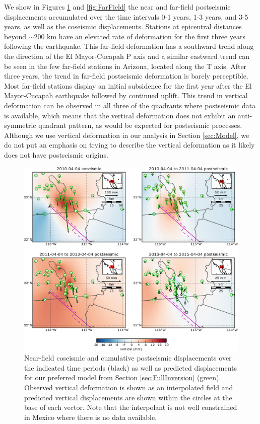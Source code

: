 \documentclass[draft,linenumbers]{AGUJournal}
\begin{document}
We show in Figures \ref{fig:NearField} and \ref{fig:FarField} the near and far-field postseismic displacements accumulated over the time intervals 0-1 years, 1-3 years, and 3-5 years, as well as the coseismic displacements.  Stations at epicentral distances beyond ${\sim}200$ km have an elevated rate of deformation for the first three years following the earthquake.  This far-field deformation has a southward trend along the direction of the El Mayor-Cucapah P axis and a similar eastward trend can be seen in the few far-field stations in Arizona, located along the T axis.  After three years, the trend in far-field postseismic deformation is barely perceptible.  Most far-field stations display an initial subsidence for the first year after the El Mayor-Cucapah earthquake followed by continued uplift.  This trend in vertical deformation can be observed in all three of the quadrants where postseismic data is available, which means that the vertical deformation does not exhibit an anti-symmetric quadrant pattern, as would be expected for postseismic processes.  Although we use vertical deformation in our analysis in Section \ref{sec:Model},  we do not put an emphasis on trying to describe the vertical deformation as it likely does not have postseismic origins.        

\begin{figure}
\includegraphics[scale=0.8]{Figures/MapViewNearField}
\centering 
\caption{Near-field coseismic and cumulative postseismic displacements over the indicated time periods (black) as well as predicted displacements for our preferred model from Section \ref{sec:FullInversion} (green).  Observed vertical deformation is shown as an interpolated field and predicted vertical displacements are shown within the circles at the base of each vector.  Note that the interpolant is not well constrained in Mexico where there is no data available.}
\label{fig:NearField}
\end{figure}
\end{document}
